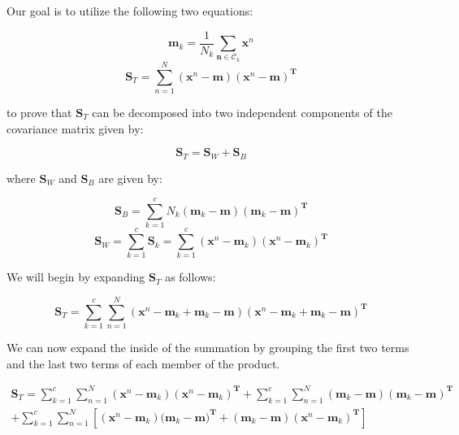 \documentclass[12pt, letterpaper]{article}
\begin{document}
Our goal is to utilize the following two equations:

\begin{equation}
\mathbf{m}_{k}=\frac{1}{N_{k}} \sum_{\mathbf{n} \in \mathcal{C}_{k}} \mathbf{x}^{n}
\end{equation}
\begin{equation}
\mathbf{S}_{T}=\sum_{n=1}^{N}\left(\mathbf{x}^{n}-\mathbf{m}\right)\left(\mathbf{x}^{n}-\mathbf{m}\right)^{\mathbf{T}}
\end{equation}

to prove that $\mathbf{S}_{T}$ can be decomposed into two independent components of the covariance matrix given by:

\begin{equation}
\mathbf{S}_{T} = \mathbf{S}_{W} + \mathbf{S}_{B}
\end{equation}

where  $\mathbf{S}_{W}$ and $ \mathbf{S}_{B}$ are given by:

\begin{equation}
\mathbf{S}_{B}=\sum_{k=1}^{c} N_{k}\left(\mathbf{m}_{k}-\mathbf{m}\right)\left(\mathbf{m}_{k}-\mathbf{m}\right)^{\mathbf{T}}
\end{equation}
\begin{equation}
\mathbf{S}_{W}=\sum_{k=1}^{c} \mathbf{S}_{k} =\sum_{k=1}^{c}(\mathbf{x}^{n}-\mathbf{m}_{k})(\mathbf{x}^{n}-\mathbf{m}_{k})^{\mathbf{T}}
\end{equation}

We will begin by expanding $\mathbf{S}_{T}$ as follows:

\begin{equation}
\mathbf{S}_{T}=\sum_{k=1}^{c} \sum_{n=1}^N\left(\mathbf{x}^n-\mathbf{m}_{k}+\mathbf{m}_{k}-\mathbf{m}\right)\left(\mathbf{x}^n-\mathbf{m}_{k}+\mathbf{m}_{k}-\mathbf{m}\right)^{\mathbf{T}}
\end{equation}

We can now expand the inside of the summation by grouping the first two terms and the last two terms of each member of the product.

\begin{multline}
\mathbf{S}_{T}=\sum_{k=1}^{c} \sum_{n=1}^N(\mathbf{x}^n -\mathbf{m}_{k})(\mathbf{x}^n -\mathbf{m}_{k})^{\mathbf{T}} + \sum_{k=1}^{c} \sum_{n=1}^N(\mathbf{m}_k -\mathbf{m})(\mathbf{m}_k -\mathbf{m})^{\mathbf{T}} \\
+ \sum_{k=1}^{c} \sum_{n=1}^{N}[(\mathbf{x}^{n}-\mathbf{m}_{k})({\mathbf{m}_{k}-\mathbf{m})^{\mathbf{T}}+(\mathbf{m}_{k}-\mathbf{m})(\mathbf{x}^{n}-\mathbf{m}_{k})^{\mathbf{T}}}] 
\end{multline}
\end{document}
